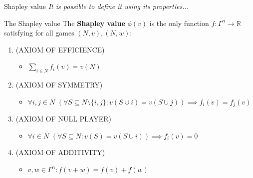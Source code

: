 \documentclass{beamer}
\begin{document}
\begin{frame}{Shapley value}
    \textit{It is possible to define it using its properties...}
    \begin{block}{The Shapley value}
       The \textbf{Shapley value} $\phi(v)$ is the only function $f \colon \Gamma^n \to \mathbb{R}$ satisfying for all games $(N,v),(N,w)$:
        \begin{enumerate}
            \item (AXIOM OF EFFICIENCE)
            \begin{itemize}
                \item $\sum_{i \in N}f_i(v) = v(N)$
            \end{itemize}
            \item (AXIOM OF SYMMETRY)
            \begin{itemize}
                \item $\forall i,j \in N$ $(\forall S \subseteq N \setminus \{i,j\}: v(S \cup i) = v(S \cup j)) \implies f_i(v) = f_j(v)$
            \end{itemize}
            \item (AXIOM OF NULL PLAYER)
            \begin{itemize}
                \item $\forall i \in N$ $(\forall S \subseteq N: v(S) = v(S \cup i)) \implies f_i(v)=0$
            \end{itemize}
            \item (AXIOM OF ADDITIVITY)
            \begin{itemize}
                \item $v,w \in \Gamma^n: f(v+w)=f(v)+f(w)$
            \end{itemize}
        \end{enumerate}
        
    \end{block}
\end{frame}


\end{document}
